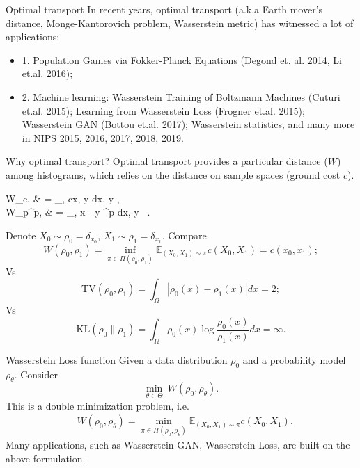 \documentclass{beamer}
\begin{document}
\begin{frame}{Optimal transport}
In recent years, optimal transport (a.k.a Earth mover's distance, Monge-Kantorovich problem, Wasserstein metric) has witnessed a lot of applications: %
\vspace{0.5cm}
\begin{itemize} 
\item 1. Population Games via Fokker-Planck Equations (Degond et. al. 2014, Li et.al. 2016);
\item 2. Machine learning: Wasserstein Training of Boltzmann Machines (Cuturi et.al. 2015); Learning from Wasserstein Loss (Frogner et.al. 2015); Wasserstein GAN (Bottou et.al. 2017); Wasserstein statistics, and many more in NIPS 2015, 2016, 2017, 2018, 2019.
\end{itemize}
\end{frame}

\begin{frame}{Why optimal transport?}
Optimal transport provides a particular distance ($W$) among histograms, which relies on the distance on sample spaces ({\color{blue}ground cost} $c$). 
\bequn
		\begin{aligned}
			W_c\lp \rho, \mu \rp & = \inf_{\pi \in \prod\lp \rho, \mu \rp} \int c\lp x, y \rp d\pi\lp x, y \rp,		\\
			W_p^p\lp \rho, \mu \rp & = \inf_{\pi \in \prod\lp \rho, \mu \rp} \int \lv x - y \rv^p d\pi\lp x, y \rp \ .
		\end{aligned}
	\eequn
Denote $X_0\sim \rho_0=\delta_{x_0}$, $X_1\sim \rho_1=\delta_{x_1}$. Compare
$$W(\rho_0,\rho_1)=\inf_{\pi\in\Pi(\rho_0, \rho_1)}\mathbb{E}_{(X_0, X_1)\sim\pi} c(X_0, X_1)=c(x_0,x_1);$$
Vs
$$\textrm{TV}(\rho_0,\rho_1)=\int_{\Omega}|\rho_0(x)-\rho_1(x)|dx=2;$$
Vs 
$$\textrm{KL}(\rho_0\|\rho_1)=\int_\Omega\rho_0(x)\log\frac{\rho_0(x)}{\rho_1(x)}dx=\infty.$$
\end{frame}


\begin{frame}{Wasserstein Loss function}
Given a data distribution $\rho_0$ and a probability model $\rho_{\theta}$. Consider
\begin{equation*}
\min_{\theta\in \Theta}~W(\rho_0, \rho_{\theta}).
\end{equation*}
This is a double minimization problem, i.e. 
\begin{equation*}
\begin{split}
&W(\rho_0, \rho_{\theta})
=\min_{\pi\in\Pi(\rho_0, \rho_{\theta})}\mathbb{E}_{(X_0, X_1)\sim\pi} c(X_0, X_1).
\end{split}
\end{equation*}
Many applications, such as Wasserstein GAN, Wasserstein Loss, are built on the above formulation.
\end{frame}
\end{document}
